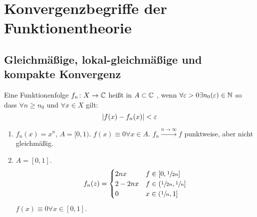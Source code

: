 \chapter{Konvergenzbegriffe der Funktionentheorie}
\section*{Gleichm\"a\ss ige, lokal-gleichm\"a\ss ige und kompakte Konvergenz}
\begin{definition}
	Eine Funktionenfolge $ f_n\colon X\rightarrow\mathbb{C} $ hei\ss t in $ A\subset\mathbb{C} $ , wenn $ \forall\varepsilon>0\exists n_0(\varepsilon)\in\mathbb{N} $ so dass $ \forall n\geq n_0 $ und $ \forall x\in X $ gilt:
	\[ |f(x)-f_n(x)|<\varepsilon \]
\end{definition}
\begin{beispiel*}
	\begin{enumerate}
		\item 	$ f_n(x)=x^n $, $ A=[0,1) $. $ f(x)\equiv 0\forall x\in A $. $ f_n\xrightarrow{n\to\infty}f $ punktweise, aber nicht gleichm\"a\ss ig.
		\item $ A=[0,1] $.
		\[ f_n(z)=\begin{cases}
		2nx&f\in[0,\sfrac{1}{2n}]\\
		2-2nx&f\in(\sfrac{1}{2n},\sfrac{1}{n}]\\
		0&x\in(\sfrac{1}{n},1]
		\end{cases} \]
		$ f(x)\equiv 0\forall x\in[0,1] $.
	\end{enumerate}
\end{beispiel*}
%
%
%
%
%
%
%
%
%
%
%
